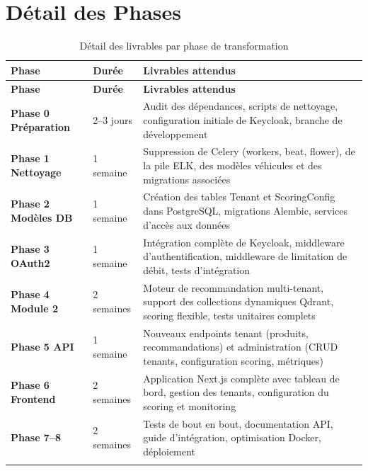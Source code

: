 \documentclass[11pt,a4paper]{report}
\begin{document}
\section{Détail des Phases}

\begin{longtable}{>{\columncolor{raasLight}\bfseries}p{2.5cm}p{2cm}p{9cm}}
\toprule
\textbf{Phase} & \textbf{Durée} & \textbf{Livrables attendus} \\
\midrule
\endfirsthead
\toprule
\textbf{Phase} & \textbf{Durée} & \textbf{Livrables attendus} \\
\midrule
\endhead
Phase 0 Préparation & 2--3 jours & Audit des dépendances, scripts de nettoyage, configuration initiale de Keycloak, branche de développement \\
\midrule
Phase 1 Nettoyage & 1 semaine & Suppression de Celery (workers, beat, flower), de la pile ELK, des modèles véhicules et des migrations associées \\
\midrule
Phase 2 Modèles DB & 1 semaine & Création des tables Tenant et ScoringConfig dans PostgreSQL, migrations Alembic, services d'accès aux données \\
\midrule
Phase 3 OAuth2 & 1 semaine & Intégration complète de Keycloak, middleware d'authentification, middleware de limitation de débit, tests d'intégration \\
\midrule
Phase 4 Module 2 & 2 semaines & Moteur de recommandation multi-tenant, support des collections dynamiques Qdrant, scoring flexible, tests unitaires complets \\
\midrule
Phase 5 API & 1 semaine & Nouveaux endpoints tenant (produits, recommandations) et administration (CRUD tenants, configuration scoring, métriques) \\
\midrule
Phase 6 Frontend & 2 semaines & Application Next.js complète avec tableau de bord, gestion des tenants, configuration du scoring et monitoring \\
\midrule
Phase 7--8 & 2 semaines & Tests de bout en bout, documentation API, guide d'intégration, optimisation Docker, déploiement \\
\bottomrule
\caption{Détail des livrables par phase de transformation}
\label{tab:phases-detail}
\end{longtable}

\end{document}
